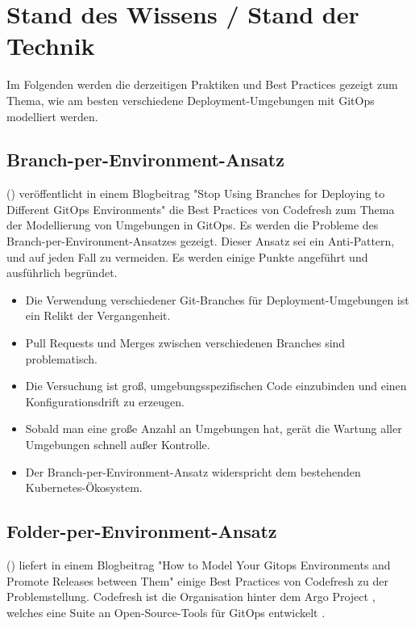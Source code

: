 \chapter{Stand des Wissens / Stand der Technik}

Im Folgenden werden die derzeitigen Praktiken und Best Practices
gezeigt zum Thema,
wie am besten verschiedene Deployment-Umgebungen mit GitOps modelliert werden.


\section{Branch-per-Environment-Ansatz}

\citeauthor{codefreshStopUsingBranchesGitOpsEnvironments} (\citeyear{codefreshStopUsingBranchesGitOpsEnvironments})
veröffentlicht in einem Blogbeitrag "Stop Using Branches for Deploying to Different GitOps Environments"
die Best Practices von Codefresh zum Thema der Modellierung von Umgebungen in GitOps.
Es werden die Probleme des Branch-per-Environment-Ansatzes gezeigt.
Dieser Ansatz sei ein Anti-Pattern,
und auf jeden Fall zu vermeiden.
Es werden einige Punkte angeführt und ausführlich begründet.

\begin{itemize}
	\item Die Verwendung verschiedener Git-Branches für Deployment-Umgebungen ist ein Relikt der Vergangenheit.
	\item Pull Requests und Merges zwischen verschiedenen Branches sind problematisch.
	\item Die Versuchung ist groß, umgebungsspezifischen Code einzubinden und einen Konfigurationsdrift zu erzeugen.
	\item Sobald man eine große Anzahl an Umgebungen hat, gerät die Wartung aller Umgebungen schnell außer Kontrolle.
	\item Der Branch-per-Environment-Ansatz widerspricht dem bestehenden Kubernetes-Ökosystem.
\end{itemize}


\section{Folder-per-Environment-Ansatz}

\citeauthor{codefreshHowToModelGitOpsEnvironmentsAndPromote} (\citeyear{codefreshHowToModelGitOpsEnvironmentsAndPromote})
liefert in einem Blogbeitrag
"How to Model Your Gitops Environments and Promote Releases between Them"
einige Best Practices von Codefresh zu der Problemstellung.
Codefresh ist die Organisation hinter dem Argo Project
\autocite{argoProjWebsite},
welches eine Suite an Open-Source-Tools für GitOps
entwickelt
\autocite{codefreshHowToModelGitOpsEnvironmentsAndPromote}.
\bigskip

